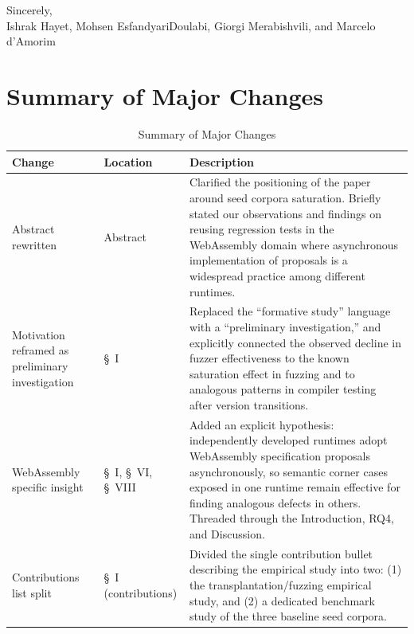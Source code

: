 \documentclass[11pt]{article}
\newcommand{\authorList}{Ishrak Hayet, Mohsen EsfandyariDoulabi, Giorgi Merabishvili, and Marcelo d'Amorim}
\begin{document}
\vspace{1em}
Sincerely,\\
\authorList

\clearpage

\section{Summary of Major Changes}

\begin{table}[!h]
\centering
\footnotesize
\caption{Summary of Major Changes}
\label{tab:summary_changes}
\begin{tabular}{|>{\raggedright\arraybackslash}m{2.7cm}|>{\centering\arraybackslash}m{2.2cm}|>{\raggedright\arraybackslash}m{10cm}|}
\hline
\textbf{Change} & \textbf{Location} & \textbf{Description} \\
\hline

Abstract rewritten &
Abstract &
Clarified the positioning of the paper around seed corpora saturation. Briefly stated our observations and findings on reusing regression tests in the WebAssembly domain where asynchronous implementation of proposals is a widespread practice among different runtimes. \\
\hline

Motivation reframed as preliminary investigation &
\S~I &
Replaced the ``formative study'' language with a ``preliminary investigation,'' and explicitly connected the observed decline in fuzzer effectiveness to the known saturation effect in fuzzing and to analogous patterns in compiler testing after version transitions. \\
\hline

WebAssembly specific insight &
\S~I, \S~VI, \S~VIII &
Added an explicit hypothesis: independently developed runtimes adopt WebAssembly specification proposals asynchronously, so semantic corner cases exposed in one runtime remain effective for finding analogous defects in others. Threaded through the Introduction, RQ4, and Discussion. \\
\hline

Contributions list split &
\S~I (contributions) &
Divided the single contribution bullet describing the empirical study into two: (1) the transplantation/fuzzing empirical study, and (2) a dedicated benchmark study of the three baseline seed corpora. \\
\hline


\end{tabular}
\end{table}
\end{document}
